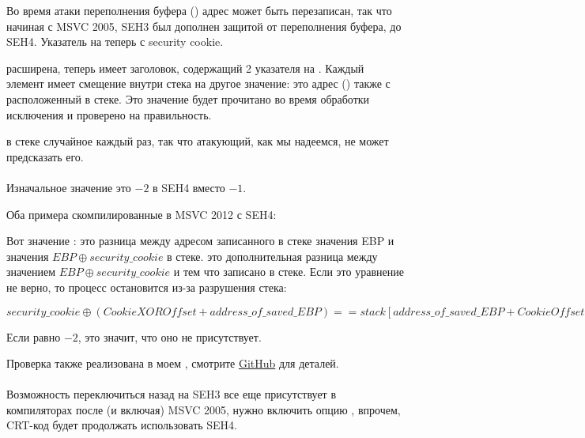 \myindex{\BufferOverflow}
Во время атаки переполнения буфера ()
адрес  может быть перезаписан, так что начиная с MSVC 2005, SEH3 был дополнен защитой от переполнения буфера, до SEH4.
Указатель на  теперь  с \gls{security cookie}.

 расширена, теперь имеет заголовок, содержащий 2 указателя на .
Каждый элемент имеет смещение внутри стека на другое значение: это адрес  (\EBP) также  с 
 расположенный в стеке.
Это значение будет прочитано во время обработки исключения и проверено на правильность.

 в стеке случайное каждый раз, так что атакующий, как мы надеемся, не может предсказать его.\\
\\
Изначальное значение  это $-2$ в SEH4 вместо $-1$.

\def\SEHfour{1}


Оба примера скомпилированные в MSVC 2012 с SEH4:





Вот значение :  
это разница между адресом записанного в стеке значения EBP и значения $EBP \oplus security\_cookie$ в стеке.
 это дополнительная разница между значением $EBP \oplus security\_cookie$ и тем что записано в стеке.
Если это уравнение не верно, то процесс остановится из-за разрушения стека:

\begin{center}
$security\_cookie \oplus (CookieXOROffset + address\_of\_saved\_EBP) == stack[address\_of\_saved\_EBP + CookieOffset]$
\end{center}

Если  равно $-2$, это значит, что оно не присутствует.

Проверка  также реализована в моем \tracer{},
смотрите \href{http://go.yurichev.com/17061}{GitHub} для деталей.\\
\\
Возможность переключиться назад на SEH3 все еще присутствует в компиляторах после (и включая) MSVC 2005, нужно включить
опцию , впрочем, \ac{CRT}-код будет продолжать использовать SEH4.

